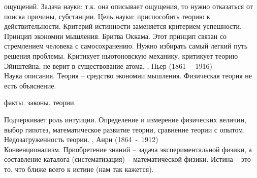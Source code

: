 \documentclass[a4paper,12pt]{report} %
\begin{document}
\begin{itemize}
ощущений. Задача науки: т.к. она описывает ощущения, то нужно
отказаться от поиска причины, субстанции. Цель науки: приспособить
теорию к действительности. Критерий истинности заменяется критерием
успешности. Принцип экономии мышления. Бритва Оккама. Этот принцип
связан со стремлением человека с самосохранению. Нужно избирать самый
легкий путь решения проблемы. Критикует ньютоновскую механику,
критикует теорию Эйнштейна, не верит в существование атома.
, Пьер (1861~-~1916)\\
Наука описания. Теория -- средство экономии мышления. Физическая
теория не есть объяснение.
\begin{enumerate}
 факты. 
 законы.
 теории.
\end{enumerate}
Подчеркивает роль интуиции. Определение и измерение физических
величин, выбор гипотез, математическое развитие теории, сравнение
теории с опытом. Недозагруженность теории.
, Анри (1864~-~1912)\\
Конвенционализм. Приобретение знаний -- задача экспериментальной
физики, а составление каталога (систематизация) -- математической
физики.
Истина -- это то, что ближе всего к истине (нам так кажется).
\end{itemize}
\end{document}

